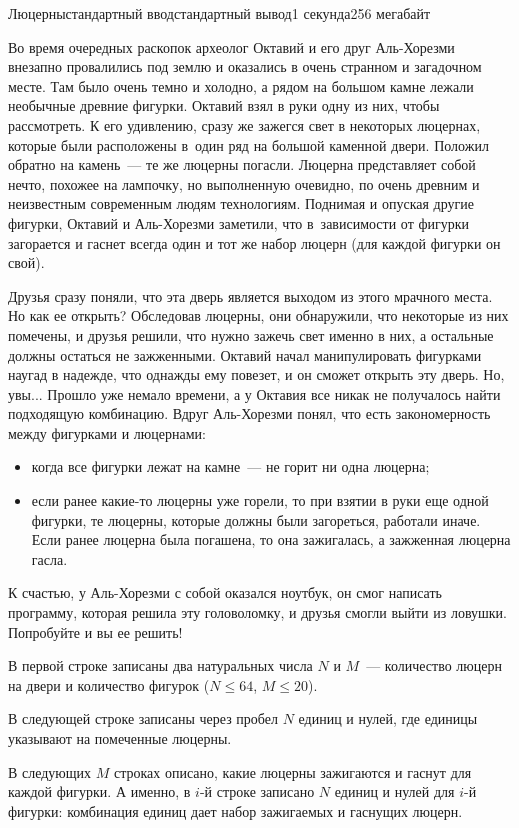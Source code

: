 \begin{problem}{Люцерны}{стандартный ввод}{стандартный вывод}{1 секунда}{256 мегабайт}

Во время очередных раскопок археолог Октавий и его друг Аль-Хорезми внезапно провалились под землю и оказались в очень странном и загадочном месте. Там было очень темно и холодно, а рядом на большом камне лежали необычные древние фигурки. Октавий взял в руки одну из них, чтобы рассмотреть. К его удивлению, сразу же зажегся свет в некоторых люцернах, которые были расположены в~один ряд на большой каменной двери. Положил обратно на камень~--- те же люцерны погасли. Люцерна представляет собой нечто, похожее на лампочку, но выполненную очевидно, по очень древним и неизвестным современным людям технологиям. Поднимая и опуская другие фигурки, Октавий и Аль-Хорезми заметили, что в~зависимости от фигурки загорается и гаснет всегда один и тот же набор люцерн (для каждой фигурки он свой).

Друзья сразу поняли, что эта дверь является выходом из этого мрачного места. Но как ее открыть? Обследовав люцерны, они обнаружили, что некоторые из них помечены, и друзья решили, что нужно зажечь свет именно в них, а остальные должны остаться не зажженными. Октавий начал манипулировать фигурками наугад в надежде, что однажды ему повезет, и он сможет открыть эту дверь. Но, увы... Прошло уже немало времени, а у Октавия все никак не получалось найти подходящую комбинацию. Вдруг Аль-Хорезми понял, что есть закономерность между фигурками и люцернами:
\begin{itemize}
\item когда все фигурки лежат на камне~--- не горит ни одна люцерна;
\item если ранее какие-то люцерны уже горели, то при взятии в руки еще одной фигурки, те люцерны, которые должны были загореться, работали иначе. Если ранее люцерна была погашена, то она зажигалась, а зажженная люцерна гасла.
\end{itemize}
К счастью, у Аль-Хорезми с собой оказался ноутбук, он смог написать программу, которая решила эту головоломку, и друзья смогли выйти из ловушки. Попробуйте и вы ее решить!

\InputFile
В первой строке записаны два натуральных числа $N$ и $M$~--- количество люцерн на двери и количество фигурок ($N \le 64$, $M \le 20$).

В следующей строке записаны через пробел $N$ единиц и нулей, где единицы указывают на помеченные люцерны.

В следующих $M$ строках описано, какие люцерны зажигаются и гаснут для каждой фигурки. А именно, в $i$-й строке записано $N$ единиц и нулей для $i$-й фигурки: комбинация единиц дает набор зажигаемых и гаснущих люцерн.


\end{problem}
